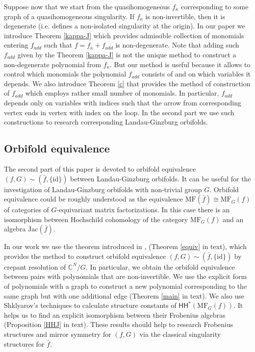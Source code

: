 \documentclass[reqno,12pt]{amsart}
\numberwithin{equation}{section}
\theoremstyle{plain}
\theoremstyle{definition}
\newcommand{\CC}{{\mathbb{C}}}
\newcommand{\Jac}{\mathrm{Jac}}
\newcommand{\id}{\mathrm{id}}
\newcommand{\ccHH}{{\mathsf{HH}}}
\begin{document}
Suppose now that we start from the quasihomogeneous $f_\kappa$ corresponding to some graph of a quasihomogeneous singularity. If $f_\kappa$ is non-invertible, then it is degenerate (i.e. defines a non-isolated singularity at the origin). In our paper we introduce Theorem \ref{kappa-J} which provides admissible collection of monomials entering $f_{add}$ such that $f = f_\kappa + f_{add}$ is non-degenerate. Note that adding such $f_{add}$ given by the Theorem \ref{kappa-J} is not the unique method to construct a non-degenerate polynomial from $f_\kappa$. But our method is useful because it allows to control which monomials the polynomial $f_{add}$ consists of and on which variables it depends. We also introduce Theorem \ref{c} that provides the method of construction of $f_{add}$ which employs rather small number of monomials. In particular, $f_{add}$ depends only on variables with indices such that the arrow from corresponding vertex ends in vertex with index on the loop. In the second part we use such constructions to research corresponding Landau-Ginzburg orbifolds.
\subsection*{Orbifold equivalence}
The second part of this paper is devoted to orbifold equivalence $(f,G) \sim (\bar{f}, \{\id\})$ between Landau-Ginzburg orbifolds. It can be useful for the investigation of Landau-Ginzburg orbifolds with non-trivial group $G$. Orbifold equivalence could be roughly understood as the equivalence $\mathrm{MF}(\bar{f}) \cong \mathrm{MF}_G(f)$ of categories of $G$-equivariant matrix factorizations. In this case there is an isomorphism between Hochschild cohomology of the category $\mathrm{MF}_G(f)$ and an algebra $\Jac(\bar{f})$.

In our work we use the theorem introduced in \cite{BP}, \cite{Io} (Theorem \ref{equiv} in text), which provides the method to construct orbifold equivalence $(f,G) \sim (\bar{f}, \{\id\})$ by crepant resolution of $\CC^N/G$. In particular, we obtain the orbifold equivalence between pairs with polynomials that are non-invertible. We use the explicit form of polynomials with a  graph to construct a new polynomial corresponding to the same graph but with one additional edge (Theorem \ref{main} in text). We also use Shklyarov's \cite{Sh} techniques to calculate structure constants of $\ccHH^*(\mathrm{MF}_G(f))$. It helps us to find an explicit isomorphism between their Frobenius algebras (Proposition \ref{HHJ} in text). These results should help to research Frobenius structures and mirror symmetry for $(f, G)$ via the classical singularity structures for $\bar{f}$.
\end{document}
